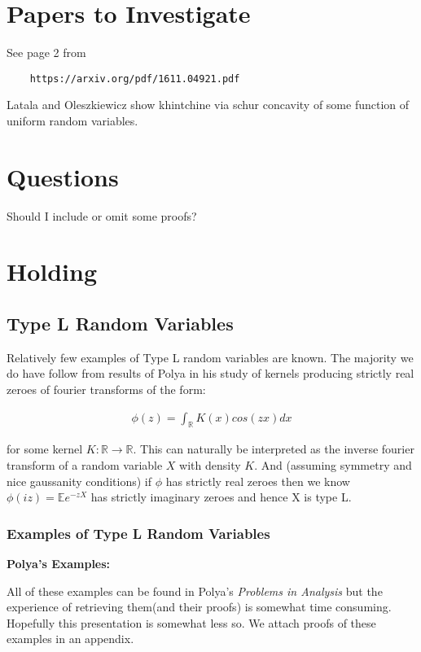 \documentclass[10pt]{article}
\newcommand{\E}{\mathbb{E}}
\newcommand{\1}{\textbf{1}}
\newcommand{\R}{\mathbb{R}}
\theoremstyle{remark}
\theoremstyle{definition}
\begin{document}
\section{Papers to Investigate}

See page 2 from 

\begin{verbatim}
	https://arxiv.org/pdf/1611.04921.pdf
\end{verbatim}

Latala and Oleszkiewicz show khintchine via schur concavity of some function of uniform random variables.

\section{Questions}

Should I include or omit some proofs?

\section{Holding}

\subsection{Type L Random Variables}

Relatively few examples of Type L random variables are known. The majority we do have follow from results of Polya in his study of kernels producing strictly real zeroes of fourier transforms of the form:

\begin{align*}
	\phi(z) = \int_{\R} K(x)cos(zx)dx
\end{align*}

for some kernel $K : \R \to \R$. This can naturally be interpreted as the inverse fourier transform of a random variable $X$ with density $K$. And (assuming symmetry and nice gaussanity conditions) if $\phi$ has strictly real zeroes then we know $\phi(iz) = \E e^{-zX}$ has strictly imaginary zeroes and hence X is type L.

\subsubsection{Examples of Type L Random Variables}

\textbf{Polya's Examples:}

All of these examples can be found in Polya's \textit{Problems in Analysis} but the experience of retrieving them(and their proofs) is somewhat time consuming. Hopefully this presentation is somewhat less so. We attach proofs of these examples in an appendix. 
\end{document}
